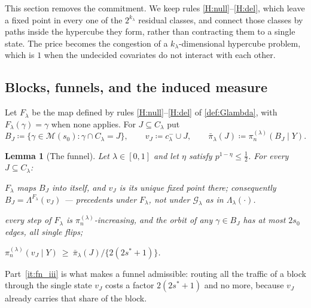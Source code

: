 \documentclass[aos]{imsart}
\theoremstyle{plain}
\newtheorem{lemma}{Lemma}[section]
\theoremstyle{definition}
\begin{document}
    This section removes the commitment. We keep rules
    \ref{H:null}--\ref{H:del}, which leave a fixed point in every one of the
    $2^{k_\lambda}$ residual classes, and connect those classes by paths
    inside the hypercube they form, rather than contracting them to a single
    state. The price becomes the congestion of a $k_\lambda$-dimensional
    hypercube problem, which is $1$ when the undecided covariates do not
    interact with each other.

    \subsection{Blocks, funnels, and the induced measure}

    Let $F_\lambda$ be the map defined by rules
    \ref{H:null}--\ref{H:del} of \cref{def:Glambda}, with $F_\lambda(\gamma)
    =\gamma$ when none applies. For $J\subseteq C_\lambda$ put
    \begin{equation}
        \label{eq:blocks}
        B_J\coloneq\{\gamma\in\mathscr{M}(s_0):\gamma\cap C_\lambda=J\},
        \qquad
        v_J\coloneq c^{-}_\lambda\cup J,
        \qquad
        \bar\pi_\lambda(J)\coloneq\pi_n^{(\lambda)}(B_J\mid Y) .
    \end{equation}

    \begin{lemma}[The funnel]
        \label{lemma:funnel}
        Let $\lambda\in[0,1]$ and let $\eta$ satisfy $p^{1-\eta}\leq\tfrac12$.
        For every $J\subseteq C_\lambda$:
        \begin{equivcond}
            \item\label{it:fn_i} $F_\lambda$ maps $B_J$ into itself, and
            $v_J$ is its unique fixed point there; consequently
            $B_J=\Lambda^{F_\lambda}(v_J)$ --- precedents under $F_\lambda$,
            not under $\mathcal{G}_\lambda$ as in $\Lambda_\lambda(\cdot)$.
            \item\label{it:fn_ii} every step of $F_\lambda$ is
            $\pi_n^{(\lambda)}$-increasing, and the orbit of any
            $\gamma\in B_J$ has at most $2s_0$ edges, all single flips;
            \item\label{it:fn_iii}
            $\pi_n^{(\lambda)}(v_J\mid Y)\ \geq\
            \bar\pi_\lambda(J)/\{2(2s^{\ast}+1)\}$.
        \end{equivcond}
    \end{lemma}


    Part~\ref{it:fn_iii} is what makes a funnel admissible: routing all the
    traffic of a block through the single state $v_J$ costs a factor
    $2(2s^{\ast}+1)$ and no more, because $v_J$ already carries that share of
    the block.
\end{document}
